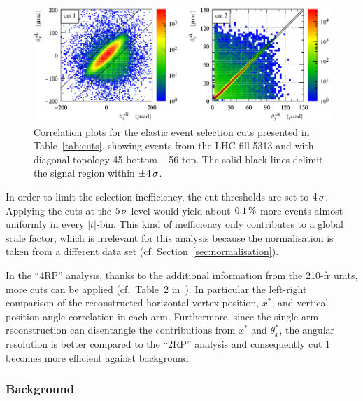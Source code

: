 \begin{figure}
\begin{center}
\includegraphics{fig/cut_example.pdf}
\caption{%
Correlation plots for the elastic event selection cuts presented in Table~\ref{tab:cuts}, showing events from the LHC fill 5313 and with diagonal topology 45 bottom -- 56 top. The solid black lines delimit the signal region within $\pm 4\,{\rm \sigma}$.
}
\label{fig:cuts}
\end{center}
\end{figure}

In order to limit the selection inefficiency, the cut thresholds are set to $4\,{\rm \sigma}$. Applying the cuts at the $5\,{\rm \sigma}$-level would yield about $0.1\,{\rm \%}$ more events almost uniformly in every $|t|$-bin. This kind of inefficiency only contributes to a global scale factor, which is irrelevant for this analysis because the normalisation is taken from a different data set (cf. Section~\ref{sec:normalisation}).

In the ``4RP'' analysis, thanks to the additional information from the 210-fr units, more cuts can be applied (cf.~Table~2 in~\cite{epl101-el}). In particular the left-right comparison of the reconstructed horizontal vertex position, $x^*$, and vertical position-angle correlation in each arm. Furthermore, since the single-arm reconstruction can disentangle the contributions from $x^*$ and $\theta^*_x$, the angular resolution is better compared to the ``2RP'' analysis and consequently cut 1 becomes more efficient against background.





\subsubsection{Background}
\label{sec:background}

